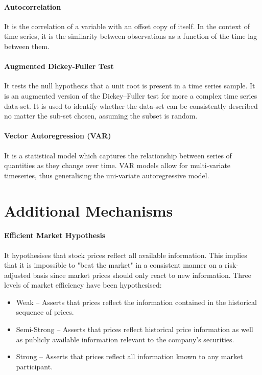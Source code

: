 \paragraph{Autocorrelation}

It is the correlation of a variable with an offset copy of itself. In the context of time series, it is the similarity between observations as a function of the time lag between them.

\paragraph{Augmented Dickey-Fuller Test}

It tests the null hypothesis that a unit root is present in a time series sample. It is an augmented version of the Dickey–Fuller test for more a complex time series data-set. It is used to identify whether the data-set can be consistently described no matter the sub-set chosen, assuming the subset is random.

\paragraph{Vector Autoregression (VAR)}

It is a statistical model which captures the relationship between series of quantities as they change over time\cite{varDairy}. VAR models allow for multi-variate timeseries, thus generalising the uni-variate autoregressive model.

\section{Additional Mechanisms}

\paragraph{Efficient Market Hypothesis}

It hypothesises that stock prices reflect all available information. This implies that it is impossible to "beat the market" in a consistent manner on a risk-adjusted basis since market prices should only react to new information\cite{malkiel1989efficient}. Three levels of market efficiency have been hypothesised:
\begin{itemize}
    \item Weak -- Asserts that prices reflect the information contained in the historical sequence of prices.
    \item Semi-Strong -- Asserts that prices reflect historical price information as well as publicly available information relevant to the company's securities.
    \item Strong -- Asserts that prices reflect all information known to any market participant.
\end{itemize}


